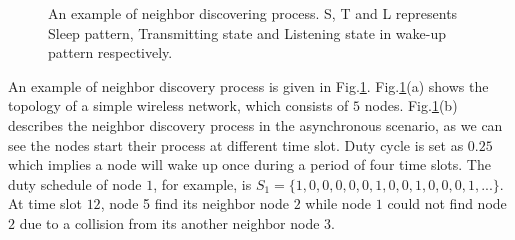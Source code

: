 \begin{figure}[!h]
\centering
{}
\vspace{0.03in}
\caption{An example of neighbor discovering process. S, T and L represents Sleep pattern, 
Transmitting state and Listening state in wake-up pattern respectively.}
\label{NDexample}
\end{figure}

An example of neighbor discovery process is given in Fig.\ref{NDexample}. 
Fig.\ref{NDexample}(a) shows the topology of a simple
wireless network, which consists of $5$ nodes. 
Fig.\ref{NDexample}(b) describes the neighbor discovery process 
in the asynchronous scenario, as we can see the nodes 
start their process at different time slot. 
Duty cycle is set as $0.25$ which implies a node will wake up 
once during a period of four time slots. The duty schedule of 
node $1$, for example, is $S_1 = \{ 1, 0, 0, 0, 0, 0, 1, 0, 0, 1, 0, 0, 0, 1, ... \}$.  
At time slot $12$, node 5 find its neighbor node $2$ while node $1$ 
could not find node $2$ due to a collision from its another neighbor node $3$. 



